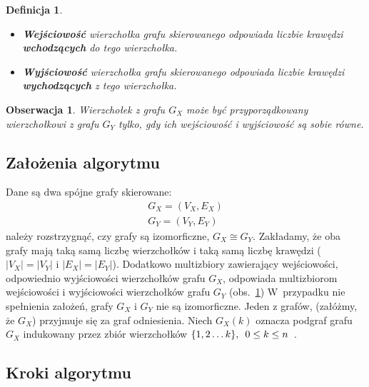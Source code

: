 \documentclass[12pt, a4paper, ]{article} %
\newtheorem{definicja}{Definicja}
\newtheorem{obserwacja}{Obserwacja}
\begin{document}
\vspace{10 pt}
\begin{definicja}\label{def:WejWyj}
    \mbox{}
    \begin{itemize}
        \item[(i)] \textbf{Wejściowość} wierzchołka grafu skierowanego
            odpowiada liczbie krawędzi \textbf{wchodzących} do tego wierzchołka.
        \item[(ii)] \textbf{Wyjściowość} wierzchołka grafu skierowanego
            odpowiada liczbie krawędzi \textbf{wychodzących} z tego wierzchołka.
    \end{itemize}
\end{definicja}


\vspace{1 pt}
\begin{obserwacja}\label{obs:WejWyj}
    Wierzchołek z grafu $G_{X}$ może być przyporządkowany wierzchołkowi z grafu
    $G_{Y}$ tylko, gdy ich wejściowość i wyjściowość są sobie równe.
\end{obserwacja}
\vspace{3 pt}

\subsection{Założenia algorytmu}
Dane są dwa spójne grafy skierowane:
\[
    \begin{array}{l}
        G_{X} = (V_{X}, E_{X})\\
        G_{Y} = (V_{Y}, E_{Y})
    \end{array}
\]
należy rozstrzygnąć, czy grafy są izomorficzne, $G_{X} \cong G_{Y}$. Zakładamy,
że oba grafy mają taką samą liczbę wierzchołków i taką samą liczbę krawędzi
($|V_{X}| = |V_{Y}|$ i $|E_{X}| = |E_{Y}|$). Dodatkowo multizbiory zawierający
wejściowości, odpowiednio wyjściowości wierzchołków grafu $G_{X}$, odpowiada
multizbiorom wejściowości i wyjściowości wierzchołków grafu $G_{Y}$
(obs.~\ref{obs:WejWyj}) W~przypadku nie spełnienia założeń, grafy $G_{X}$ i
$G_{Y}$ nie są izomorficzne. Jeden z grafów, (załóżmy, że $G_{X}$) przyjmuje
się za graf odniesienia. Niech $G_{X}(k)$ oznacza podgraf grafu $G_{X}$
indukowany przez zbiór wierzchołków $\{1, 2 \ldots k\},\hspace{0.5 em}0 \leq k
\leq n$~\cite[str.~362]{b:AlgKomb:1985}.


\subsection{Kroki algorytmu}
\end{document}
